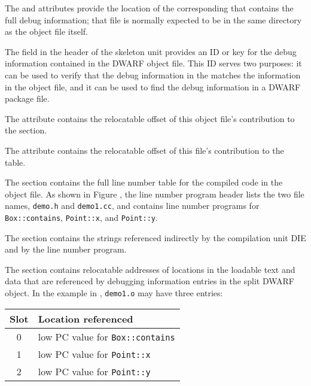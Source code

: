 The \DWATcompdir{} and \DWATdwoname{} attributes provide the
location of the corresponding \splitDWARFobjectfile{} that
contains the full debug information; that file is normally
expected to be in the same directory as the object file itself.

The \HFNdwoid{} field in the header of the skeleton unit provides 
an ID or key for the debug information contained in the 
DWARF object file. This ID serves
two purposes: it can be used to verify that the debug information
in the \splitDWARFobjectfile{} matches the information in the object
file, and it can be used to find the debug information in a DWARF
package file.

The \DWATaddrbase{} attribute contains the relocatable offset of
this object file's contribution to the \dotdebugaddr{} section.
\bbeb

The \DWATstmtlist{} attribute contains the relocatable offset of
this file's contribution to the \dotdebugline{} table.

\bbpareb

The \dotdebugline{} section contains the full line number table for
the compiled code in the object file. As shown in
Figure , the line
number program header lists the two file names, \texttt{demo.h} and
\texttt{demo1.cc}, and contains line number programs for
\texttt{Box::contains}, \texttt{Point::x}, and \texttt{Point::y}.

The \dotdebugstr{} section contains the strings referenced indirectly
by the compilation unit DIE and by the line number program.

The \dotdebugaddr{} section contains relocatable addresses of
locations in the loadable text and data that are referenced by
debugging information entries in the split DWARF object. In the
example in , 
\texttt{demo1.o} may have three entries:
\begin{center}
\begin{tabular}{cl}
Slot & Location referenced \\
\hline
   0   &  low PC value for \texttt{Box::contains}  \\
   1   &  low PC value for \texttt{Point::x}       \\
   2   &  low PC value for \texttt{Point::y}       \\
\end{tabular}
\end{center}

